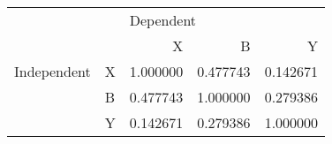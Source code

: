 \begin{tabular}{llrrr}
\toprule
            &   & \multicolumn{3}{l}{Dependent} \\
            &   &         X &         B &         Y \\
\midrule
Independent & X &  1.000000 &  0.477743 &  0.142671 \\
            & B &  0.477743 &  1.000000 &  0.279386 \\
            & Y &  0.142671 &  0.279386 &  1.000000 \\
\bottomrule
\end{tabular}
